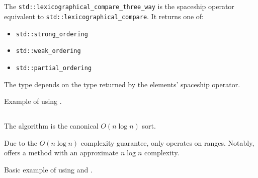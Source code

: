 \subsection{\texorpdfstring{}{\texttt{std::lexicographical\_compare\_three\_way}}}

The \texttt{std::lexicographical\_compare\_three\_way} is the spaceship operator equivalent to \texttt{std::lexicographical\_compare}. It returns one of:
\begin{itemize}
    \item\texttt{std::strong\_ordering}
    \item \texttt{std::weak\_ordering}
    \item \texttt{std::partial\_ordering}
\end{itemize}

The type depends on the type returned by the elements' spaceship operator.


\begin{codebox}[]{\href{https://compiler-explorer.com/z/vrEqPaEEz}{\ExternalLink}}
\footnotesize Example of using .
\tcblower
{}
\end{codebox}

\subsection{\texorpdfstring{}{\texttt{std::sort}}}

The  algorithm is the canonical $O(n\log n)$ sort.


Due to the $O(n\log n)$ complexity guarantee,  only operates on  ranges. Notably,  offers a method with an approximate $n\log n$ complexity.

\begin{codebox}[]{\href{https://compiler-explorer.com/z/vef61TWj9}{\ExternalLink}}
\footnotesize Basic example of using  and .
\tcblower
{}
\end{codebox}

